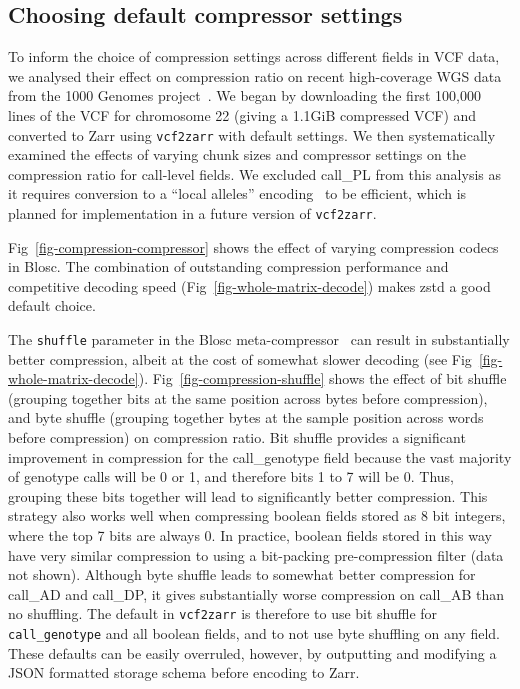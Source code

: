 \documentclass[a4paper,num-refs]{oup-contemporary}
\begin{document}
\subsection{Choosing default compressor settings}
To inform the choice of compression settings across different fields
in VCF data, we analysed their effect on compression ratio on
recent high-coverage WGS data from the 1000 Genomes
project~\citep{byrska2022high}. We began by downloading
the first 100,000 lines of the VCF
for chromosome 22 (giving a 1.1GiB compressed VCF)
and converted to Zarr using
\texttt{vcf2zarr} with default settings. We then systematically
examined the effects of varying chunk sizes and compressor settings
on the compression ratio for call-level fields. We excluded call\_PL
from this analysis as it requires conversion to a ``local alleles''
encoding~\citep{poterba2024scalable} to be efficient,
which is planned for implementation in a future
version of \texttt{vcf2zarr}.

Fig~\ref{fig-compression-compressor} shows the effect of varying compression
codecs in Blosc. The combination of outstanding compression performance
and competitive decoding speed (Fig~\ref{fig-whole-matrix-decode})
makes zstd a good default choice.

The \texttt{shuffle} parameter in the Blosc meta-compressor~\cite{alted2010modern}
can result in substantially better compression, albeit at the
cost of somewhat slower decoding (see Fig~\ref{fig-whole-matrix-decode}).
Fig~\ref{fig-compression-shuffle} shows the effect of
bit shuffle (grouping together bits at the same position
across bytes before compression), and byte shuffle (grouping together
bytes at the sample position across words before compression)
on compression ratio. Bit shuffle provides a significant
improvement in compression for the call\_genotype field  because
the vast majority of genotype calls will be 0 or 1, and therefore
bits 1 to 7 will be 0. Thus, grouping these bits together will
lead to significantly better compression. This strategy also
works well when compressing boolean fields stored as
8 bit integers, where the top 7 bits are always 0. In practice,
boolean fields stored in this way have very similar compression
to using a bit-packing pre-compression filter (data not shown).
Although byte shuffle leads to somewhat better compression for call\_AD
and call\_DP, it gives substantially worse compression on call\_AB
than no shuffling.
The default in \texttt{vcf2zarr}
is therefore to use bit shuffle for \texttt{call\_genotype}
and all boolean fields, and to not use
byte shuffling on any field. These defaults can be easily
overruled, however, by outputting and modifying a JSON formatted
storage schema before encoding to Zarr.
\end{document}

